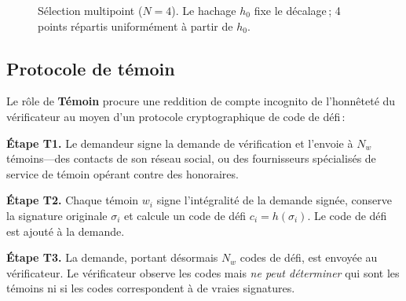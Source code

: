 \documentclass[11pt,a4paper,twocolumn]{article}
\begin{document}
\begin{figure}[ht]
\centering
{}
\caption{Sélection multipoint ($N{=}4$). Le hachage $h_0$ fixe le décalage\,; 4 points répartis uniformément à partir de $h_0$.}
\label{fig:multipoint}
\end{figure}

\subsection{Protocole de témoin}

Le rôle de \textbf{Témoin} procure une reddition de compte incognito de l'honnêteté du vérificateur au moyen d'un protocole cryptographique de code de défi\,:

\textbf{Étape T1.} Le demandeur signe la demande de vérification et l'envoie à $N_w$ témoins---des contacts de son réseau social, ou des fournisseurs spécialisés de service de témoin opérant contre des honoraires.

\textbf{Étape T2.} Chaque témoin $w_i$ signe l'intégralité de la demande signée, conserve la signature originale $\sigma_i$ et calcule un code de défi $c_i = h(\sigma_i)$. Le code de défi est ajouté à la demande.

\textbf{Étape T3.} La demande, portant désormais $N_w$ codes de défi, est envoyée au vérificateur. Le vérificateur observe les codes mais \emph{ne peut déterminer} qui sont les témoins ni si les codes correspondent à de vraies signatures.
\end{document}
